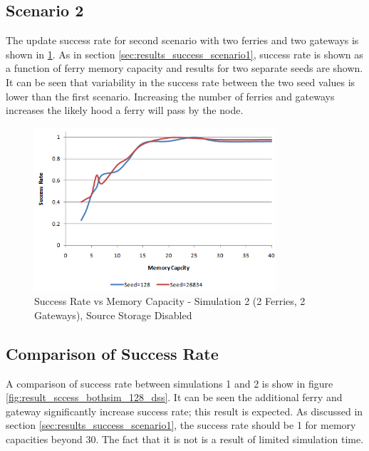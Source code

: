 \subsection{Scenario 2}

The update success rate for second scenario with two ferries and two gateways is shown in \ref{fig:result_sccess_sim2byseed_dss}.
As in section \ref{sec:results_success_scenario1}, success rate is shown as a function of ferry memory capacity and results for two separate seeds are shown.
It can be seen that variability in the success rate between the two seed values is lower than the first scenario.
Increasing the number of ferries and gateways increases the likely hood a ferry will pass by the node.

\begin{figure}[htbp]
    \centering
    \includegraphics[width=0.8\textwidth]{images/result_sccess_sim2byseed_dss}
    \caption{Success Rate vs Memory Capacity - Simulation 2 (2 Ferries, 2 Gateways), Source Storage Disabled}
    \label{fig:result_sccess_sim2byseed_dss}
\end{figure}

\subsection{Comparison of Success Rate}

A comparison of success rate between simulations 1 and 2 is show in figure \ref{fig:result_sccess_bothsim_128_dss}.
It can be seen the additional ferry and gateway significantly increase success rate; this result is expected.
As discussed in section \ref{sec:results_success_scenario1}, the success rate should be 1 for memory capacities beyond 30. 
The fact that it is not is a result of limited simulation time.

